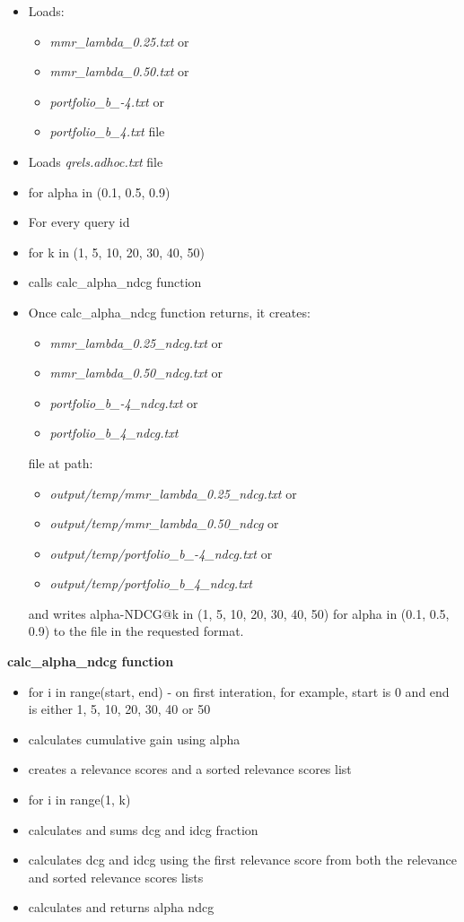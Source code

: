 \documentclass{article} %
\begin{document}
\begin{itemize}
    \item Loads:
    \begin{itemize}
        \item \textit{mmr\_lambda\_0.25.txt} or
        \item \textit{mmr\_lambda\_0.50.txt} or
        \item \textit{portfolio\_b\_-4.txt} or
        \item \textit{portfolio\_b\_4.txt} file
    \end{itemize}
    \item Loads \textit{qrels.adhoc.txt} file
    \item for alpha in (0.1, 0.5, 0.9)
    \item For every query id
    \item for k in (1, 5, 10, 20, 30, 40, 50)
    \item calls calc\_alpha\_ndcg function
    \item Once calc\_alpha\_ndcg function returns, it creates:
    \begin{itemize}
        \item \textit{mmr\_lambda\_0.25\_ndcg.txt} or
        \item \textit{mmr\_lambda\_0.50\_ndcg.txt} or
        \item \textit{portfolio\_b\_-4\_ndcg.txt} or
        \item \textit{portfolio\_b\_4\_ndcg.txt}    
    \end{itemize}
    file at path:
     \begin{itemize}
         \item \textit{output/temp/mmr\_lambda\_0.25\_ndcg.txt} or
         \item \textit{output/temp/mmr\_lambda\_0.50\_ndcg} or
         \item \textit{output/temp/portfolio\_b\_-4\_ndcg.txt} or
         \item \textit{output/temp/portfolio\_b\_4\_ndcg.txt}
     \end{itemize} and writes alpha-NDCG@k in (1, 5, 10, 20, 30, 40, 50) for alpha in (0.1, 0.5, 0.9) to the file in the requested format.
\end{itemize}

\textbf{calc\_alpha\_ndcg function}

\begin{itemize}
    \item for i in range(start, end) - on first interation, for example, start is 0 and end is either 1, 5, 10, 20, 30, 40 or 50
    \item calculates cumulative gain using alpha
    \item creates a relevance scores and a sorted relevance scores list
    \item for i in range(1, k)
    \item calculates and sums dcg and idcg fraction
    \item calculates dcg and idcg using the first relevance score from both the relevance and sorted relevance scores lists
    \item calculates and returns alpha ndcg
\end{itemize}
\end{document}
